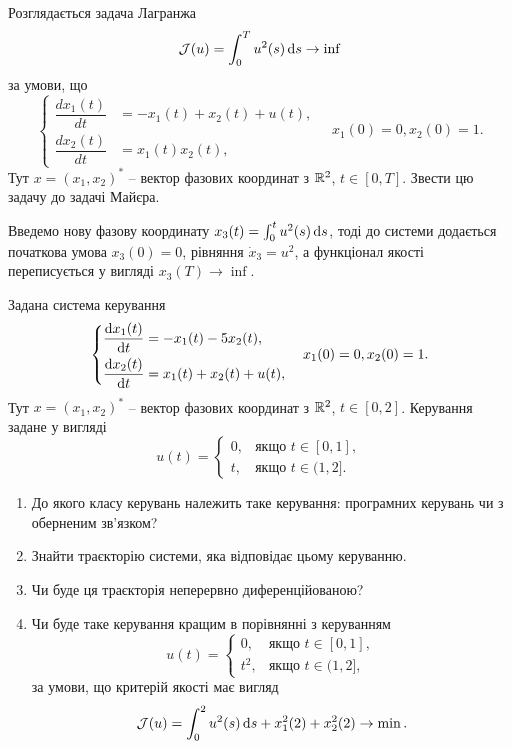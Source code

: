 \begin{problem}
	Розглядається задача Лагранжа
		\[
		\mathcal{J}(u)
		=
		\int_0^T u^2(s) \mathop{}\!\mathrm{d} s \to \inf
		\]
		за умови, що
		\[
			\left\{
				\begin{aligned}
					\dfrac{dx_1(t)}{dt} &= -x_1(t) + x_2(t) + u(t), \\
					\dfrac{dx_2(t)}{dt} &= x_1(t)x_2(t),
				\end{aligned}
			\right.
			\quad
			x_1(0)=0,x_2(0)=1.
		\]
		Тут $x=(x_1,x_2)^*$ -- вектор фазових координат з $\mathbb{R}^2$, $t\in[0,T]$. Звести цю задачу до задачі Майєра.
\end{problem}

\begin{solution}
	Введемо нову фазову координату $x_3(t)=\int_0^t u^2(s) \mathop{}\!\mathrm{d} s$, тоді до системи додається початкова умова $x_3(0)=0$, рівняння $\dot x_3 = u^2$, а функціонал якості переписується у вигляді $x_3(T) \to \inf$.
\end{solution}


\begin{problem}
	Задана система керування \[ \left\{ \begin{aligned}
		\frac{\mathop{}\!\mathrm{d} x_1 (t)}{\mathop{}\!\mathrm{d} t} &= - x_1 (t) - 5 x_2 (t), \\
		\frac{\mathop{}\!\mathrm{d} x_2 (t)}{\mathop{}\!\mathrm{d} t} &= x_1 (t) + x_2 (t) + u(t),
	\end{aligned} \right. 
	\quad x_1 (0) = 0, x_2 (0) = 1. \]
	Тут $x = (x_1, x_2)^*$ -- вектор фазових координат з $\mathbb{R}^2$, $t \in [0, 2]$. Керування задане у вигляді \[ u(t) = \begin{cases} 0, & \text{якщо } t \in [0, 1], \\ t, & \text{якщо } t \in (1, 2]. \end{cases} \]
	\begin{enumerate}
		\item До якого класу керувань належить таке керування: програмних керувань чи з оберненим зв'язком?

		\item Знайти траєкторію системи, яка відповідає цьому керуванню.

		\item Чи буде ця траєкторія неперервно диференційованою?

		\item Чи буде таке керування кращим в порівнянні з керуванням \[ u(t) = \begin{cases} 0, & \text{якщо } t \in [0, 1], \\ t^2, & \text{якщо } t \in (1, 2], \end{cases} \] за умови, що критерій якості має вигляд \[ \mathcal{J} (u) = \int_0^2 u^2(s) \mathop{}\!\mathrm{d} s + x_1^2 (2) + x_2^2 (2) \to \min. \]
	\end{enumerate}
\end{problem}

